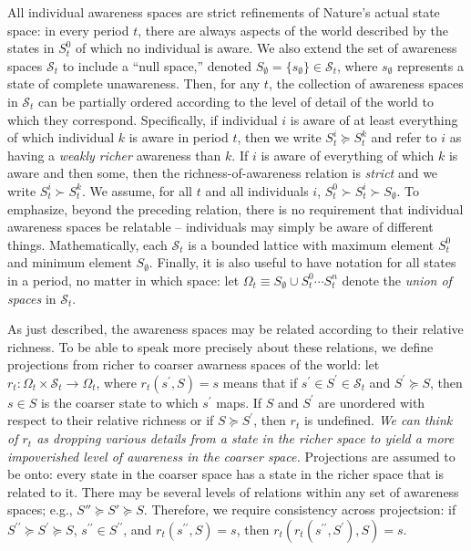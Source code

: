 \documentclass[
11pt,
titlepage,
reqno,
]{article}%
\theoremstyle{definition}
\begin{document}
All individual awareness spaces are strict refinements of Nature's actual state space: in every period $t$, there are always aspects of the world described by the states in $S^0_t$ of which no individual is aware.
We also extend the set of awareness spaces $\mathcal{S}_t$ to include a ``null space,'' denoted $S_\emptyset=\{s_\emptyset\}\in\mathcal{S}_t$, where $s_\emptyset$ represents a state of complete unawareness. 
Then, for any $t$, the collection of awareness spaces in $\mathcal{S}_t$ can be partially ordered according to the level of detail of the world to which they correspond.
Specifically, if individual $i$ is aware of at least everything of which individual $k$ is aware in period $t$, then we write $S^i_t\succeq S^k_t$ and refer to $i$ as having a \textit{weakly richer} awareness than $k$.
If $i$ is aware of everything of which $k$ is aware and then some, then the richness-of-awareness relation is \textit{strict} and we write $S^i_t\succ S^k_t$.
We assume, for all $t$ and all individuals $i$, $S^0_t\succ S^i_t\succ S_\emptyset$.
To emphasize, beyond the preceding relation, there is no requirement that individual awareness spaces be relatable -- individuals may simply be aware of different things.
Mathematically, each $\mathcal{S}_t$ is a bounded lattice with maximum element $S^0_t$ and minimum element $S_\emptyset$.
Finally, it is also useful to have notation for all states in a period, no matter in which space: let $\Omega_t\equiv S_\emptyset\cup S^0_t \cdots S^n_t$ denote the \textit{union of spaces} in $\mathcal{S}_t$. 


As just described, the awareness spaces may be related according to their relative richness. To be able to speak more precisely about these relations, we define projections from richer to coarser awarness spaces of the world:  let $r_t: \Omega_t\times\mathcal{S}_t\longrightarrow\Omega_t$,  where $r_t(s^\prime,S)=s$ means that if $s^\prime\in S^\prime\in\mathcal{S}_t$ and $S^\prime\succeq S$, then $s\in S$ is the coarser state to which $s^\prime$ maps. 
If $S$ and $S^\prime$ are unordered with respect to their relative richness or if $S\succeq S^\prime$, then $r_t$ is undefined.
\textit{We can think of $r_t$ as dropping various details from a state in the richer space to yield a more impoverished level of awareness  in the coarser space.}
Projections are assumed to be onto: every state in the coarser space has a state in the richer space that is related to it. 
There may be several levels of relations within any set of awareness spaces; e.g., $S'' \succeq S' \succeq S$. 
Therefore, we require consistency across projectsion: if $S^{\prime\prime} \succeq S^{\prime} \succeq S$, $s^{\prime\prime}\in S^{\prime\prime}$, and $r_t(s^{\prime\prime},S) = s$, then $r_t(r_t(s^{\prime\prime},S^{\prime}),S) = s$.
\end{document}
